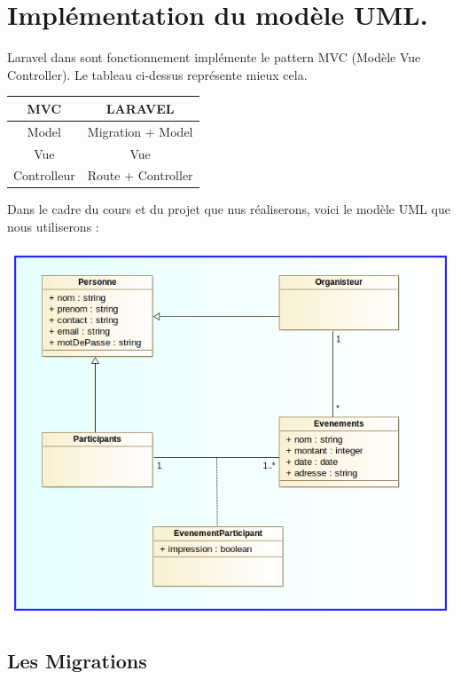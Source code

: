 \documentclass[12pt,a4paper]{article}
\begin{document}
\newpage


\section{Implémentation du modèle UML.}


Laravel dans sont fonctionnement implémente le pattern MVC (Modèle Vue Controller). Le tableau ci-dessus représente mieux cela.


\begin{center}
\begin{tabular}{|c|c|}
\hline 
MVC & LARAVEL \\ 
\hline 
Model & Migration + Model \\ 
\hline 
Vue & Vue \\ 
\hline 
Controlleur & Route + Controller \\ 
\hline 
\end{tabular} 
\end{center}


Dans le cadre du cours et du projet que nus réaliserons, voici le modèle UML que nous utiliserons :\\
\begin{center}
\includegraphics[scale=0.7]{img/model.png}
\end{center} 



\subsection{Les Migrations}
\end{document}
